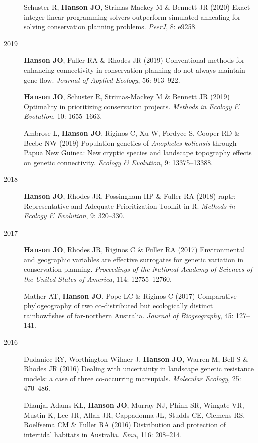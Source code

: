 \documentclass[12pt,a4paper]{article}
\begin{document}
\begin{description}
\item[] Schuster R, \textbf{Hanson JO}, Strimas-Mackey M \& Bennett JR (2020) Exact integer linear programming solvers outperform simulated annealing for solving conservation planning problems. \textit{PeerJ}, 8: e9258.

\item[2019] \textbf{Hanson JO}, Fuller RA \& Rhodes JR (2019) Conventional methods for enhancing connectivity in conservation planning do not always maintain gene flow. \textit{Journal of Applied Ecology}, 56: 913--922.

\item[] \textbf{Hanson JO}, Schuster R, Strimas-Mackey M \& Bennett JR (2019) Optimality in prioritizing conservation projects. \textit{Methods in Ecology \& Evolution}, 10: 1655--1663.

\item[] Ambrose L, \textbf{Hanson JO}, Riginos C, Xu W, Fordyce S, Cooper RD \& Beebe NW (2019) Population genetics of \textit{Anopheles koliensis} through Papua New Guinea: New cryptic species and landscape topography effects on genetic connectivity. \textit{Ecology \& Evolution}, 9: 13375--13388.

\item[2018] \textbf{Hanson JO}, Rhodes JR, Possingham HP \& Fuller RA (2018) raptr: Representative and Adequate Prioritization Toolkit in R. \textit{Methods in Ecology \& Evolution}, 9: 320--330.

\item[2017] \textbf{Hanson JO}, Rhodes JR, Riginos C \& Fuller RA (2017) Environmental and geographic variables are effective surrogates for genetic variation in conservation planning. \textit{Proceedings of the National Academy of Sciences of the United States of America}, 114: 12755--12760.

\item[] Mather AT, \textbf{Hanson JO}, Pope LC \& Riginos C (2017) Comparative phylogeography of two co-distributed but ecologically distinct rainbowfishes of far-northern Australia. \textit{Journal of Biogeography}, 45: 127--141.

\item[2016] Dudaniec RY, Worthington Wilmer J, \textbf{Hanson JO}, Warren M, Bell S \& Rhodes JR (2016) Dealing with uncertainty in landscape genetic resistance models: a case of three co-occurring marsupials. \textit{Molecular Ecology}, 25: 470--486.

\item[] Dhanjal-Adams KL, \textbf{Hanson JO}, Murray NJ, Phinn SR, Wingate VR, Mustin K, Lee JR, Allan JR, Cappadonna JL, Studds CE, Clemens RS, Roelfsema CM \& Fuller RA (2016) Distribution and protection of intertidal habitats in Australia. \textit{Emu}, 116: 208--214.


\end{description}
\end{document}
